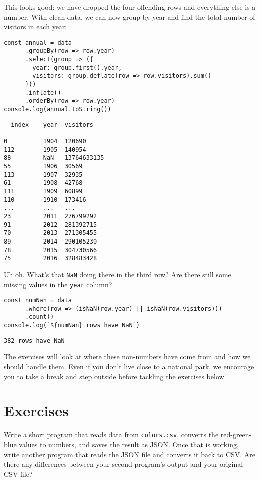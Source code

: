 This looks good:
we have dropped the four offending rows and everything else is a number.
With clean data,
we can now group by year
and find the total number of visitors in each year:

\begin{verbatim}
const annual = data
      .groupBy(row => row.year)
      .select(group => ({
        year: group.first().year,
        visitors: group.deflate(row => row.visitors).sum()
      }))
      .inflate()
      .orderBy(row => row.year)
console.log(annual.toString())
\end{verbatim}

\begin{verbatim}
__index__  year  visitors   
---------  ----  -----------
0          1904  120690     
112        1905  140954     
88         NaN   13764633135
55         1906  30569      
113        1907  32935      
61         1908  42768      
111        1909  60899      
110        1910  173416     
...        ...   ...
23         2011  276799292  
91         2012  281392715  
70         2013  271305455  
89         2014  290105230  
78         2015  304730566  
75         2016  328483428  
\end{verbatim}

Uh oh.
What's that \texttt{NaN} doing there in the third row?
Are there still some missing values in the \texttt{year} column?

\begin{verbatim}
const numNan = data
      .where(row => (isNaN(row.year) || isNaN(row.visitors)))
      .count()
console.log(`${numNan} rows have NaN`)
\end{verbatim}

\begin{verbatim}
382 rows have NaN
\end{verbatim}

The exercises will look at where these non-numbers have come from and how we should handle them.
Even if you don't live close to a national park,
we encourage you to take a break and step outside before tackling the exercises below.

\section{Exercises}\label{s:dataforge-exercises}


Write a short program that reads data from \texttt{colors.csv},
converts the red-green-blue values to numbers,
and saves the result as JSON.
Once that is working,
write another program that reads the JSON file and converts it back to CSV.
Are there any differences between your second program's output
and your original CSV file?

